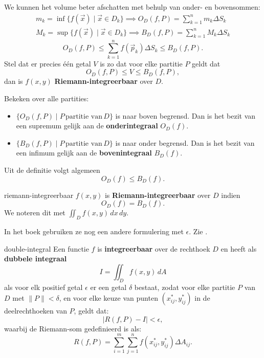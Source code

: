 \documentclass[
    10pt,
    a4paper,
    twoside,
]{report}
\begin{document}
We kunnen het volume beter afschatten met behulp van onder- en bovensommen:
\begin{align*}
    m_k = \inf\{f(\vec{x}) \mid \vec{x} \in D_k\} \implies O_D(f,P) = \sum_{k=1}^{n} m_k \Delta S_k \\
    M_k = \sup\{f(\vec{x}) \mid \vec{x} \in D_k\} \implies B_D(f,P) = \sum_{k=1}^{n} M_k \Delta S_k
\end{align*}
\[
    O_D(f,P) \leq \sum_{k=1}^{n} f(\vec{p}_k) \Delta S_k \leq B_D(f,P).
\]
Stel dat er precies één getal $V$ is zo dat voor elke partitie $P$ geldt dat
\[
    O_D(f,P) \leq V \leq B_D(f,P),
\] dan is $f(x,y)$ \textbf{Riemann-integreerbaar} over $D$.

Bekeken over alle partities:
\begin{itemize}
    \item $\{O_D(f,P) \mid P\, \text{partitie van}\, D\}$ is naar boven begrensd.
        Dan is het bezit van een supremum gelijk aan de \textbf{onderintegraal} $O_D(f)$.
    \item $\{B_D(f,P) \mid P\, \text{partitie van}\, D\}$ is naar onder begrensd.
        Dan is het bezit van een infimum gelijk aan de \textbf{bovenintegraal} $B_D(f)$.
\end{itemize}
Uit de definitie volgt algemeen
\[
    O_D(f) \leq B_D(f).
\]

\begin{definitie}{}{riemann-integreerbaar}
    $f(x,y)$ is \textbf{Riemann-integreerbaar} over $D$ indien
    \[
        O_D(f) = B_D(f).
    \]
    We noteren dit met $\displaystyle \iint_D f(x,y)\,dx\,dy$.
\end{definitie}

\begin{opmerking}{}
    In het boek gebruiken ze nog een andere formulering met $\epsilon$. Zie .
\end{opmerking}

\begin{definitie}{\cite[835]{cursus}}{double-integral}
    Een functie $f$ is \textbf{integreerbaar} over de rechthoek $D$ en heeft als \textbf{dubbele integraal}
    \[
        I = \iint_D f(x,y)\,dA
    \]
    als voor elk positief getal $\epsilon$ er een getal $\delta$ bestaat, zodat voor elke partitie $P$ van $D$ met $\lVert P\rVert < \delta$, en voor elke keuze van punten $(x_{ij}^*, y_{ij}^*)$ in de deelrechthoeken van $P$, geldt dat:
    \[
        \lvert R(f,P) - I\rvert < \epsilon,
    \]
    waarbij de Riemann-som gedefinieerd is als:
    \[
        R(f,P) = \sum_{i=1}^m \sum_{j=1}^n f(x_{ij}^*, y_{ij}^*) \Delta A_{ij}.
    \]
\end{definitie}

\printbibliography
\end{document}
